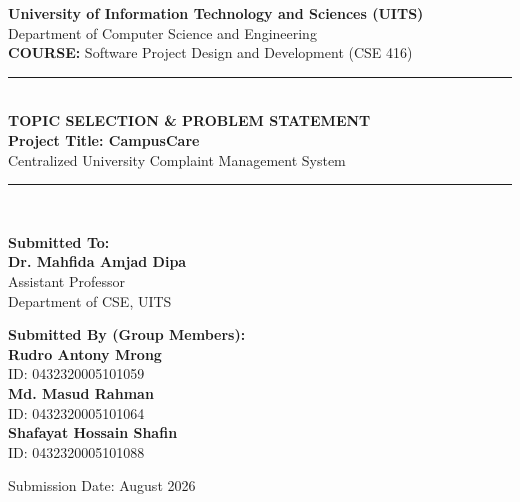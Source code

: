 \documentclass[12pt, a4paper]{article}
\begin{document}
\begin{titlepage}
    \centering
    
    {\Large \textbf{University of Information Technology and Sciences (UITS)}}\\[0.3cm]
    {\large Department of Computer Science and Engineering}\\[1.5cm]
    
    {\Large \textbf{COURSE:}} Software Project Design and Development (CSE 416)\\[1.2cm]
    
    \rule{\linewidth}{0.6mm}\\[0.5cm]
    {\LARGE \textbf{\color{navyblue}TOPIC SELECTION \& PROBLEM STATEMENT}}\\[0.3cm]
    {\large \textbf{Project Title: CampusCare}}\\[0.1cm]
    {\small Centralized University Complaint Management System}\\[0.5cm]
    \rule{\linewidth}{0.6mm}\\[1.8cm]
    
\begin{minipage}{0.48\textwidth}
    \begin{flushleft} \large
        \textbf{Submitted To:}\\[0.3cm]
        \textbf{Dr. Mahfida Amjad Dipa}\\
        Assistant Professor\\
        Department of CSE, UITS
    \end{flushleft}
\end{minipage}
\hfill
\begin{minipage}{0.48\textwidth}
    \begin{flushright} \large
        \textbf{Submitted By (Group Members):}\\[0.3cm]
        \textbf{Rudro Antony Mrong}\\
        ID: 0432320005101059\\[0.25cm]
        \textbf{Md. Masud Rahman}\\
        ID: 0432320005101064\\[0.25cm]
        \textbf{Shafayat Hossain Shafin}\\
        ID: 0432320005101088
    \end{flushright}
\end{minipage}
    
    \vfill
    {\large Submission Date: August 2026}
\end{titlepage}
\end{document}
